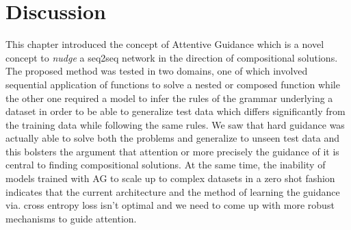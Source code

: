 \section{Discussion}\label{pm:disc}

This chapter introduced the concept of Attentive Guidance which is a novel concept to \textit{nudge} a seq2seq network in the direction of compositional solutions. The proposed method was tested in two domains, one of which involved sequential application of functions to solve a nested or composed function while the other one required a model to infer the rules of the grammar underlying a dataset in order to be able to generalize test data which differs significantly from the training data while following the same rules. We saw that hard guidance was actually able to solve both the problems and generalize to unseen test data and this bolsters the argument that attention or more precisely the guidance of it is central to finding compositional solutions. At the same time, the inability of models trained with AG to scale up to complex datasets in a zero shot fashion indicates that the current architecture and the method of learning the guidance via. cross entropy loss isn't optimal and we need to come up with more robust mechanisms to guide attention.